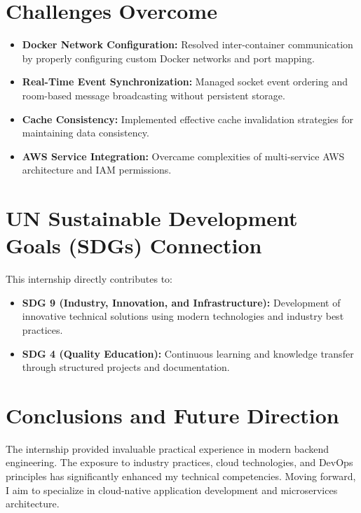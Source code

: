 \section*{Challenges Overcome}

\begin{itemize}
    \item \textbf{Docker Network Configuration:} Resolved inter-container communication by properly configuring custom Docker networks and port mapping.
    
    \item \textbf{Real-Time Event Synchronization:} Managed socket event ordering and room-based message broadcasting without persistent storage.
    
    \item \textbf{Cache Consistency:} Implemented effective cache invalidation strategies for maintaining data consistency.
    
    \item \textbf{AWS Service Integration:} Overcame complexities of multi-service AWS architecture and IAM permissions.
\end{itemize}

\section*{UN Sustainable Development Goals (SDGs) Connection}

This internship directly contributes to:

\begin{itemize}
    \item \textbf{SDG 9 (Industry, Innovation, and Infrastructure):} Development of innovative technical solutions using modern technologies and industry best practices.
    
    \item \textbf{SDG 4 (Quality Education):} Continuous learning and knowledge transfer through structured projects and documentation.
\end{itemize}

\section*{Conclusions and Future Direction}

The internship provided invaluable practical experience in modern backend engineering. The exposure to industry practices, cloud technologies, and DevOps principles has significantly enhanced my technical competencies. Moving forward, I aim to specialize in cloud-native application development and microservices architecture.
